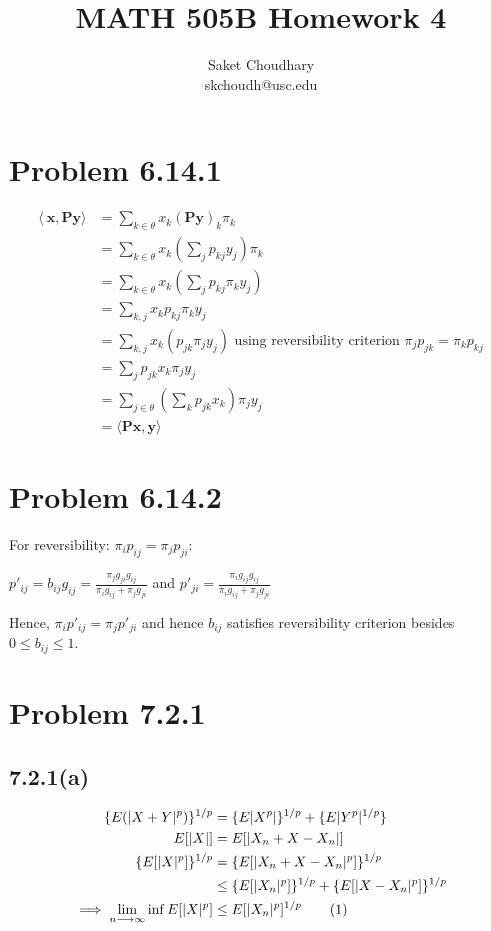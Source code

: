 \documentclass[a4paper]{article}
\title{MATH 505B Homework 4}
\author{Saket Choudhary\\skchoudh@usc.edu}
\newcommand\numberthis{\addtocounter{equation}{1}\tag{\theequation}}
\begin{document}
\maketitle

\section*{Problem 6.14.1}

\begin{align*}
\langle\ \mathbf{x}, \mathbf{Py} \rangle &= \sum_{k\in \theta} x_k (\mathbf{Py})_k\pi_k \\
&= \sum_{k\in \theta} x_k (\sum_jp_{kj}y_j)\pi_k\\
&= \sum_{k\in \theta} x_k (\sum_jp_{kj}\pi_ky_j)\\
&= \sum_{k,j} x_k p_{kj}\pi_ky_j\\
&= \sum_{k,j} x_k (p_{jk}\pi_jy_j) \text{ using reversibility criterion  } \pi_jp_{jk} = \pi_kp_{kj}\\ 
&= \sum_{j} p_{jk}x_k \pi_jy_j\\
&= \sum_{j \in \theta} (\sum_k p_{jk}x_k) \pi_jy_j\\
&= \langle \mathbf{Px,y} \rangle
\end{align*}

\section*{Problem 6.14.2}
For reversibility: $\pi_ip_{ij} = \pi_jp_{ji}$:

$p'_{ij}= b_{ij}g_{ij} = \frac{\pi_jg_{ji}g_{ij}}{\pi_ig_{ij}+\pi_jg_{ji}}$ and $p'_{ji} = \frac{\pi_ig_{ij}g_{ij}}{\pi_ig_{ij}+\pi_jg_{ji}}$

Hence, $\pi_ip'_{ij} = \pi_jp'_{ji}$ and hence $b_{ij}$ satisfies reversibility criterion besides $ 0 \leq b_{ij} \leq 1$.

\section*{Problem 7.2.1}
\subsection*{7.2.1(a)}

\begin{align*}
\{E(|X+Y|^p)\}^{1/p} &= \{E|X^p|\}^{1/p} + \{E|Y^p|^{1/p}\}\\
E[|X|] &= E[|X_n+X-X_n|]\\
\{E[|X|^p]\}^{1/p} &= \{E[|X_n+X-X_n|^p]\}^{1/p}\\
&\leq \{E[|X_n|^p]\}^{1/p}+\{E[|X-X_n|^p]\}^{1/p}\\
\implies \lim_{n \longrightarrow \infty} \inf E[|X|^p] &\leq E[|X_n|^p]^{1/p}\numberthis \label{eqn1} \\
\end{align*}
\end{document}
